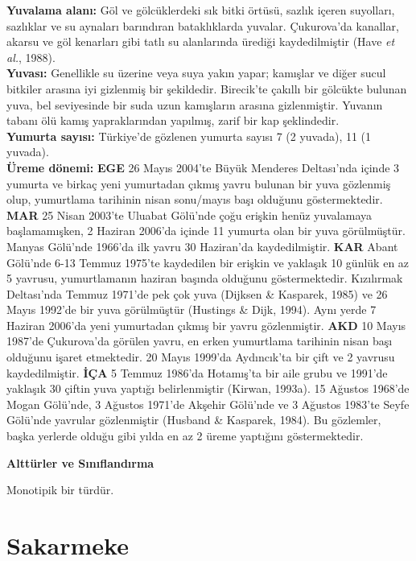 \documentclass[
  a4paper,
  DIV=11,
  numbers=noendperiod]{scrreprt}
\begin{document}
\textbf{Yuvalama alanı:} Göl ve gölcüklerdeki sık bitki örtüsü, sazlık
içeren suyolları, sazlıklar ve su aynaları barındıran bataklıklarda
yuvalar. Çukurova'da kanallar, akarsu ve göl kenarları gibi tatlı su
alanlarında ürediği kaydedilmiştir (Have \emph{et al.}, 1988).\\
\textbf{Yuvası:} Genellikle su üzerine veya suya yakın yapar; kamışlar
ve diğer sucul bitkiler arasına iyi gizlenmiş bir şekildedir. Birecik'te
çakıllı bir gölcükte bulunan yuva, bel seviyesinde bir suda uzun
kamışların arasına gizlenmiştir. Yuvanın tabanı ölü kamış yapraklarından
yapılmış, zarif bir kap şeklindedir.\\
\textbf{Yumurta sayısı:} Türkiye'de gözlenen yumurta sayısı 7 (2
yuvada), 11 (1 yuvada).\\
\textbf{Üreme dönemi:} \textbf{EGE} 26 Mayıs 2004'te Büyük Menderes
Deltası'nda içinde 3 yumurta ve birkaç yeni yumurtadan çıkmış yavru
bulunan bir yuva gözlenmiş olup, yumurtlama tarihinin nisan sonu/mayıs
başı olduğunu göstermektedir. \textbf{MAR} 25 Nisan 2003'te Uluabat
Gölü'nde çoğu erişkin henüz yuvalamaya başlamamışken, 2 Haziran 2006'da
içinde 11 yumurta olan bir yuva görülmüştür. Manyas Gölü'nde 1966'da ilk
yavru 30 Haziran'da kaydedilmiştir. \textbf{KAR} Abant Gölü'nde 6-13
Temmuz 1975'te kaydedilen bir erişkin ve yaklaşık 10 günlük en az 5
yavrusu, yumurtlamanın haziran başında olduğunu göstermektedir.
Kızılırmak Deltası'nda Temmuz 1971'de pek çok yuva (Dijksen \& Kasparek,
1985) ve 26 Mayıs 1992'de bir yuva görülmüştür (Hustings \& Dijk, 1994).
Aynı yerde 7 Haziran 2006'da yeni yumurtadan çıkmış bir yavru
gözlenmiştir. \textbf{AKD} 10 Mayıs 1987'de Çukurova'da görülen yavru,
en erken yumurtlama tarihinin nisan başı olduğunu işaret etmektedir. 20
Mayıs 1999'da Aydıncık'ta bir çift ve 2 yavrusu kaydedilmiştir.
\textbf{İÇA} 5 Temmuz 1986'da Hotamış'ta bir aile grubu ve 1991'de
yaklaşık 30 çiftin yuva yaptığı belirlenmiştir (Kirwan, 1993a). 15
Ağustos 1968'de Mogan Gölü'nde, 3 Ağustos 1971'de Akşehir Gölü'nde ve 3
Ağustos 1983'te Seyfe Gölü'nde yavrular gözlenmiştir (Husband \&
Kasparek, 1984). Bu gözlemler, başka yerlerde olduğu gibi yılda en az 2
üreme yaptığını göstermektedir.

\textbf{Alttürler ve Sınıflandırma}

Monotipik bir türdür.

\section{Sakarmeke}\label{sakarmeke}
\end{document}
